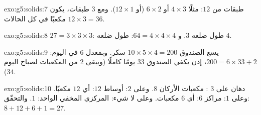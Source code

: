 \begin{solution}{exo:g5:solids:7}
طبقات من $12$: مثلًا $4 \times 3$ أو $6 \times 2$ (أو
$12 \times 1$). ومع $3$ طبقات، يكون 
$12 \times 3 = 36$ مكعبًا في كل الحالات.
\end{solution}

\begin{solution}{exo:g5:solids:8}
$27 = 3 \times 3 \times 3$:  طول ضلعه $3$.
و $64 = 4 \times 4 \times 4$:  طول ضلعه $4$.
\end{solution}

\begin{solution}{exo:g5:solids:9}
يسع الصندوق $10 \times 5 \times 4 = 200$  سكر. وبمعدل $6$ في
اليوم: $200 = 6 \times 33 + 2$، إذن يكفي الصندوق $33$ يومًا كاملًا (ويبقى
$2$ من المكعبات لصباح اليوم $34$).
\end{solution}

\begin{solution}{exo:g5:solids:10}
دهان على $3$ : مكعبات الأركان $8$. وعلى $2$: أوساط
 $12$: أي $12$ مكعبًا. وعلى $1$: مراكز  $6$:
أي $6$ مكعبات. وعلى لا شيء:  المركزي المخفي الواحد: $1$.
والتحقّق: $8 + 12 + 6 + 1 = 27$. \checkmark
\end{solution}
